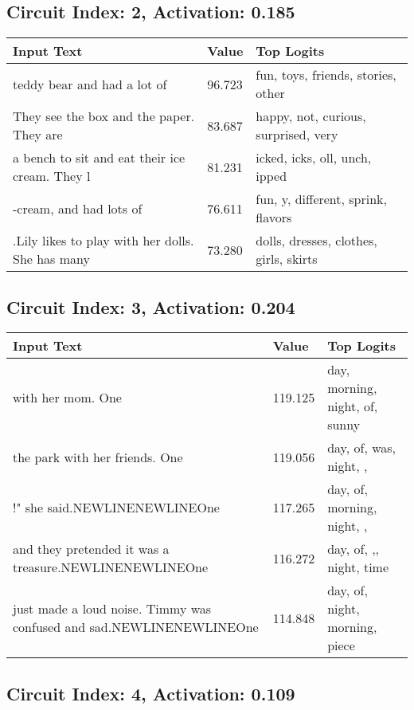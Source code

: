 \documentclass{article}
\begin{document}
\subsection*{Circuit Index: 2, Activation: 0.185}

\begin{longtable}{p{} p{} p{}}
\toprule
\textbf{Input Text} & \textbf{Value} & \textbf{Top Logits} \\
\midrule
teddy bear and had a lot of & 96.723 & fun, toys, friends, stories, other \\
They see the box and the paper. They are & 83.687 & happy, not, curious, surprised, very \\
a bench to sit and eat their ice cream. They l & 81.231 & icked, icks, oll, unch, ipped \\
-cream, and had lots of & 76.611 & fun, y, different, sprink, flavors \\
.Lily likes to play with her dolls. She has many & 73.280 & dolls, dresses, clothes, girls, skirts \\

\bottomrule
\end{longtable}
\subsection*{Circuit Index: 3, Activation: 0.204}

\begin{longtable}{p{} p{} p{}}
\toprule
\textbf{Input Text} & \textbf{Value} & \textbf{Top Logits} \\
\midrule
with her mom. One & 119.125 & day, morning, night, of, sunny \\
the park with her friends. One & 119.056 & day, of, was, night, , \\
!" she said.NEWLINENEWLINEOne & 117.265 & day, of, morning, night, , \\
and they pretended it was a treasure.NEWLINENEWLINEOne & 116.272 & day, of, ,, night, time \\
just made a loud noise. Timmy was confused and sad.NEWLINENEWLINEOne & 114.848 & day, of, night, morning, piece \\

\bottomrule
\end{longtable}
\subsection*{Circuit Index: 4, Activation: 0.109}
\end{document}
